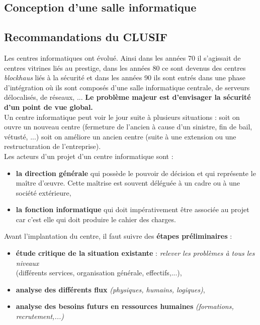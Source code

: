 \documentclass[10pt,a4paper,oneside,titlepage]{report}
\newcommand{\titre}[1]{\textcolor{title}{#1}}
\newcommand{\newterm}[1]{\textit{#1}}
\newcommand{\strong}[1]{\textbf{\titre{#1}}}
\begin{document}
\begin{sffamily}
\section{Conception d'une salle informatique}

\subsection{Recommandations du CLUSIF}

Les centres informatiques ont évolué. Ainsi dans les années 70 il s'agissait de centres vitrines liés au prestige, dans les années 80 ce sont devenus des centres 
\newterm{blockhaus} liés à la sécurité et dans les années 90 ils sont entrés dans une phase d'intégration où ils sont composés d'une salle informatique centrale, de 
serveurs délocalisés, de réseaux, ... \strong{Le problème majeur est d'envisager la sécurité d'un point de vue global.} \\

Un centre informatique peut voir le jour suite à plusieurs situations : soit on ouvre un nouveau centre (fermeture de l'ancien à cause d'un sinistre, fin de bail, vétusté, 
...) soit on améliore un ancien centre (suite à une extension ou une restructuration de l'entreprise). \\

\noindent Les acteurs d'un projet d'un centre informatique sont :
\begin{itemize}
\item \strong{la direction générale} qui possède le pouvoir de décision et qui représente le maître d'\oe uvre. Cette maîtrise est souvent déléguée à un cadre ou à une 
société extérieure,
\item \strong{la fonction informatique} qui doit impérativement \^etre associée au projet car c'est elle qui doit produire le cahier des charges. \\
\end{itemize}

\noindent Avant l'implantation du centre, il faut suivre des \strong{étapes préliminaires} :
\begin{itemize}
\item \strong{étude critique de la situation existante} : \textit{relever les problèmes à tous les niveaux}\\(différents services, organisation générale, effectifs,...),
\item \strong{analyse des différents flux} \textit{(physiques, humains, logiques)},
\item \strong{analyse des besoins futurs en ressources humaines} \textit{(formations, recrutement,...)}
\end{itemize}


\end{sffamily}
\end{document}
